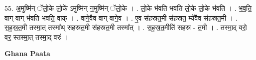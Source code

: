 \documentclass[17pt]{extarticle}
\begin{document}
55. अ॒मुष्मि॑न् ॅलो॒के लो॒के॑ ऽमुष्मि॑न् न॒मुष्मि॑न् ॅलो॒के । . लो॒के भ॑वति भवति लो॒के लो॒के भ॑वति । . भ॒व॒ति॒ वाग् वाग् भ॑वति भवति॒ वाक् । . वागे॒वैव वाग् वागे॒व । . ए॒व स॑हस्रत॒मी स॑हस्रत॒ म्ये॑वैव स॑हस्रत॒मी । . स॒ह॒स्र॒त॒मी तस्मा॒त् तस्मा᳚थ् सहस्रत॒मी स॑हस्रत॒मी तस्मा᳚त् । . स॒ह॒स्र॒त॒मीति॑ सहस्र - त॒मी । . तस्मा॒द् वरो॒ वर॒ स्तस्मा॒त् तस्मा॒द् वरः॑ । \newline

\textbf{Ghana Paata } \newline
\end{document}
